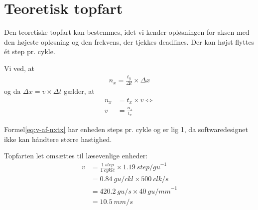 \section{Teoretisk topfart}

Den teoretiske topfart kan bestemmes, idet vi kender opløsningen for
aksen med den højeste opløsning og den frekvens, der tjekkes
deadlines. Der kan højst flyttes ét step pr. cykle.

Vi ved, at
\begin{align}
  n_x = \frac{t_y}{\Delta t} \times \Delta x
\end{align}
og da $\Delta x = v \times \Delta t$ gælder, at
\begin{align}
  n_x &= t_x \times v \Leftrightarrow \\
  v &= \frac{n_x}{t_x} \label{eq:v-af-nxtx}
\end{align}

Formel\vref{eq:v-af-nxtx} har enheden steps pr. cykle og er lig 1, da
softwaredesignet ikke kan håndtere større hastighed.

Topfarten let omsættes til læsevenlige enheder:
\begin{align}
  v &= \frac{\SI{1}{step}}{\SI{1}{cykle}} \times \SI{1,19}{step/gu}^{-1} \\
  &= \SI{0,84}{gu/ckl} \times \SI{500}{clk/s} \\
  &= \SI{420,2}{gu/s} \times \SI{40}{gu/mm}^{-1} \\
  &= \SI{10,5}{mm/s}
\end{align}


